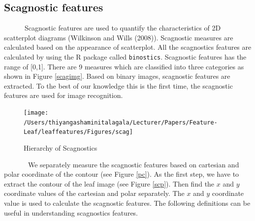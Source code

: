\documentclass{article}
\begin{document}
\hypertarget{scagnostic-features}{%
\subsection{Scagnostic features}\label{scagnostic-features}}

~~~~~~Scagnostic features are used to quantify the characteristics of 2D
scatterplot diagrams (Wilkinson and Wills (2008)). Scagnostic measures
are calculated based on the appearance of scatterplot. All the
scagnostics features are calculated by using the R package called
\texttt{binostics}. Scagnostic features has the range of {[}0,1{]}.
There are 9 measures which are classified into three categories as shown
in Figure \ref{scagimg}. Based on binary images, scagnostic features are
extracted. To the best of our knowledge this is the first time, the
scagnostic features are used for image recognition.

\begin{figure}[!ht]

{\centering \texttt{[image: /Users/thiyangashaminitalagala/Lecturer/Papers/Feature-Leaf/leaffeatures/Figures/scag]} 

}

\caption{\label{scagimg}Hierarchy of Scagnostics}\label{fig:unnamed-chunk-13}
\end{figure}

~~~~~~~We separately measure the scagnostic features based on cartesian
and polar coordinate of the contour (see Figure \ref{pc}). As the first
step, we have to extract the contour of the leaf image (see Figure
\ref{scp}). Then find the \(x\) and \(y\) coordinate values of the
cartesian and polar separately. The \(x\) and \(y\) coordinate value is
used to calculate the scagnostic features. The following definitions can
be useful in understanding scagnostics features.
\end{document}
